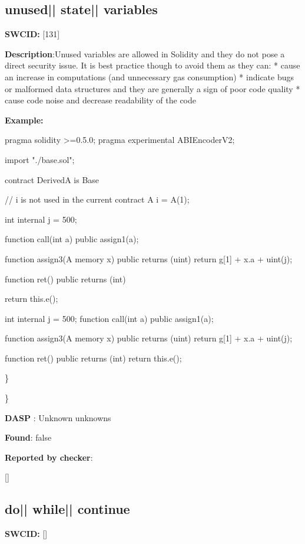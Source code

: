 \documentclass{article}
\begin{document}
\subsection{unused{|\textunderscore| }state{|\textunderscore| }variables} 
\textbf{SWC{\textunderscore }ID:} [131]

\textbf{Description}:Unused variables are allowed in Solidity and they do not pose a direct security issue. It is best practice though to avoid them as they can:
* cause an increase in computations (and unnecessary gas consumption)
* indicate bugs or malformed data structures and they are generally a sign of poor code quality
* cause code noise and decrease readability of the code


\textbf{Example:} 
\begin{ffcode} 

pragma solidity >=0.5.0;
pragma experimental ABIEncoderV2;

import "./base.sol";

contract DerivedA is Base {
    // i is not used in the current contract
    A i = A(1);

    int internal j = 500;

    function call(int a) public {
        assign1(a);
    }

    function assign3(A memory x) public returns (uint) {
        return g[1] + x.a + uint(j);
    }

    function ret() public returns (int){
        return this.e();

    }
  int internal j = 500;
function call(int a) public {
        assign1(a);
    }

    function assign3(A memory x) public returns (uint) {
        return g[1] + x.a + uint(j);
    }

    function ret() public returns (int){
        return this.e();
  }
}

\end{ffcode} 
\} 

\} 

\textbf{DASP} : Unknown unknowns

\textbf{Found}: false

\textbf{Reported by checker}: 
\begin{ffcode} 

[]
\end{ffcode} 
\subsection{do{|\textunderscore| }while{|\textunderscore| }continue} 
\textbf{SWC{\textunderscore }ID:} []
\end{document}
